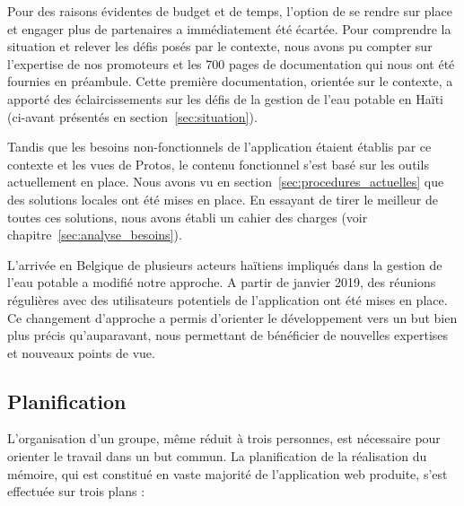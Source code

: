 \documentclass{EPL-master-thesis-covers-FR}
\begin{document}
			Pour des raisons évidentes de budget et de temps, l'option de se rendre sur place et engager plus de partenaires a immédiatement été écartée. Pour comprendre la situation et relever les défis posés par le contexte, nous avons pu compter sur l'expertise de nos promoteurs et les 700 pages de documentation qui nous ont été fournies en préambule. Cette première documentation, orientée sur le contexte, a apporté des éclaircissements sur les défis de la gestion de l'eau potable en Haïti (ci-avant présentés en section~\ref{sec:situation}).

			Tandis que les besoins non-fonctionnels de l'application étaient établis par ce contexte et les vues de Protos, le contenu fonctionnel s'est basé sur les outils actuellement en place. Nous avons vu en section~\ref{sec:procedures_actuelles} que des solutions locales ont été mises en place. En essayant de tirer le meilleur de toutes ces solutions, nous avons établi un cahier des charges (voir chapitre~\ref{sec:analyse_besoins}).

			L'arrivée en Belgique de plusieurs acteurs haïtiens impliqués dans la gestion de l'eau potable a modifié notre approche. A partir de janvier 2019, des réunions régulières avec des utilisateurs potentiels de l'application ont été mises en place. Ce changement d'approche a permis d'orienter le développement vers un but bien plus précis qu'auparavant, nous permettant de bénéficier de nouvelles expertises et nouveaux points de vue.

			\subsection*{Planification}
				\label{sec:planification}

				L'organisation d'un groupe, même réduit à trois personnes, est nécessaire pour orienter le travail dans un but commun. La planification de la réalisation du mémoire, qui est constitué en vaste majorité de l'application web produite, s'est effectuée sur trois plans :
\end{document}
